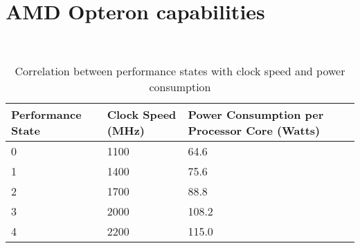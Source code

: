 \chapter{AMD Opteron capabilities}~\label{app:opteron}

\begin{table}[h!]
 \begin{center}
\begin{tabular}{| l | l | p{1in} | }
\hline	
Performance State & Clock Speed (MHz) & Power Consumption per Processor Core (Watts)\\
\hline
0 & 1100 & 64.6 \\
1 & 1400 & 75.6 \\
2 & 1700 & 88.8 \\
3 & 2000 & 108.2 \\
4 & 2200 & 115.0 \\
\hline  
\end{tabular}
 \end{center}
\caption{Correlation between performance states with clock speed and power consumption}
\label{tab:perf_power}
\end{table}
